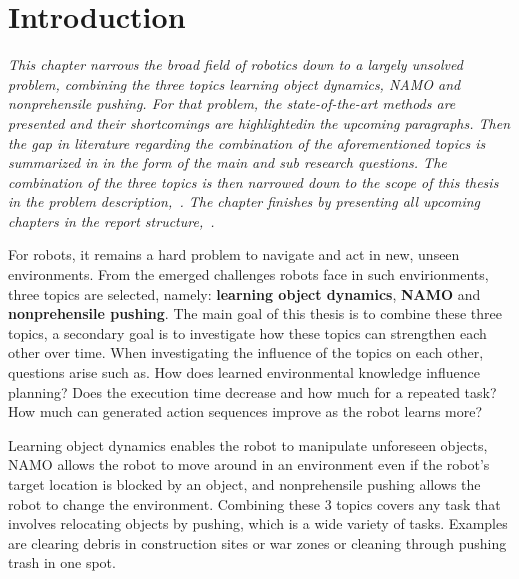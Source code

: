 \chapter{Introduction}%
\label{chap:introduction}
\textit{This chapter narrows the broad field of robotics down to a largely unsolved problem, combining the three topics learning object dynamics, \ac{NAMO} and nonprehensile pushing. For that problem, the state-of-the-art methods are presented and their shortcomings are highlightedin the upcoming paragraphs. Then the gap in literature regarding the combination of the aforementioned topics is summarized in  in the form of the main and sub research questions. The combination of the three topics is then narrowed down to the scope of this thesis in the problem description,~. The chapter finishes by presenting all upcoming chapters in the report structure,~.\bs}



For robots, it remains a hard problem to navigate and act in new, unseen environments. From the emerged challenges robots face in such envirionments, three topics are selected, namely: \textbf{learning object dynamics}, \textbf{\acf{NAMO}} and \textbf{nonprehensile pushing}. The main goal of this thesis is to combine these three topics, a secondary goal is to investigate how these topics can strengthen each other over time. When investigating the influence of the topics on each other, questions arise such as. How does learned environmental knowledge influence planning? Does the execution time decrease and how much for a repeated task? How much can generated action sequences improve as the robot learns more?\bs

Learning object dynamics enables the robot to manipulate unforeseen objects, \ac{NAMO} allows the robot to move around in an environment even if the robot's target location is blocked by an object, and nonprehensile pushing allows the robot to change the environment. Combining these 3 topics covers any task that involves relocating objects by pushing, which is a wide variety of tasks. Examples are clearing debris in construction sites or war zones or cleaning through pushing trash in one spot.\bs

